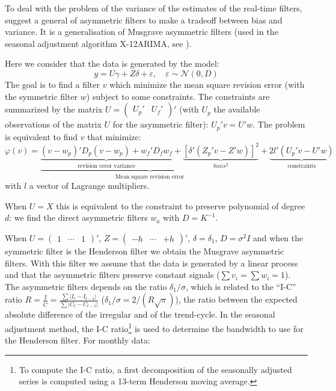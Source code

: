 \documentclass[
  12pt,
  ,
  a4paper]{article}
\newcommand\1{\mathds{1}}
\begin{document}
To deal with the problem of the variance of the estimates of the real-time filters, \textcite{proietti2008} suggest a general of asymmetric filters to make a tradeoff between bias and variance.
It is a generalisation of Musgrave asymmetric filters (used in the seasonal adjustment algorithm X-12ARIMA, see \textcite{musgrave1964set}).

Here we consider that the data is generated by the model:
\[
y=U\gamma+Z\delta+\varepsilon,\quad
\varepsilon\sim\mathcal{N}(0,D)
\]
The goal is to find a filter \(v\) which minimize the mean square revision error (with the symmetric filter \(w\)) subject to some constraints.
The constraints are summarized by the matrix \(U=\begin{pmatrix}U_{p}'&U_{f}'\end{pmatrix}'\) (with \(U_p\) the available observations of the matrix \(U\) for the asymmetric filter): \(U_p'v=U'w\).
The problem is equivalent to find \(v\) that minimize:
\begin{equation}
\varphi(v)=
\underbrace{
  \underbrace{(v-w_{p})'D_{p}(v-w_{p})+
  w_{f}'D_{f}w_{f}}_\text{revision error variance}+
  \underbrace{[\delta'(Z_{p}'v-Z'w)]^{2}}_{biais^2}
}_\text{Mean square revision error}+
\underbrace{2l'(U_{p}'v-U'w)}_{\text{constraints}}
\label{eq:lppasym}
\end{equation}
with \(l\) a vector of Lagrange multipliers.

When \(U=X\) this is equivalent to the constraint to preserve polynomial of degree \(d\): we find the direct asymmetric filters \(w_a\) with \(D=K^{-1}\).

When \(U=\begin{pmatrix}1&\cdots&1\end{pmatrix}'\), \(Z=\begin{pmatrix}-h&\cdots&+h\end{pmatrix}'\), \(\delta=\delta_1\), \(D=\sigma^2I\) and when the symmetric filter is the Henderson filter we obtain the Musgrave asymmetric filters.
With this filter we assume that the data is generated by a linear process and that the asymmetric filters preserve constant signals (\(\sum v_i=\sum w_i=1\)).
The asymmetric filters depends on the ratio \(\delta_1/\sigma\), which is related to the ``I-C'' ratio \(R=\frac{\bar{I}}{\bar{C}}=\frac{\sum\lvert I_t-I_{t-1}\rvert}{\sum\lvert C_t-C_{t-1}\rvert}\) (\(\delta_1/\sigma=2/(R\sqrt{\pi})\)), the ratio between the expected absolute difference of the irregular and of the trend-cycle.
In the seasonal adjustment method, the I-C ratio\footnote{To compute the I-C ratio, a first decomposition of the seasonally adjusted series is computed using a 13-term Henderson moving average.} is used to determine the bandwidth to use for the Henderson filter. For monthly data:
\end{document}
